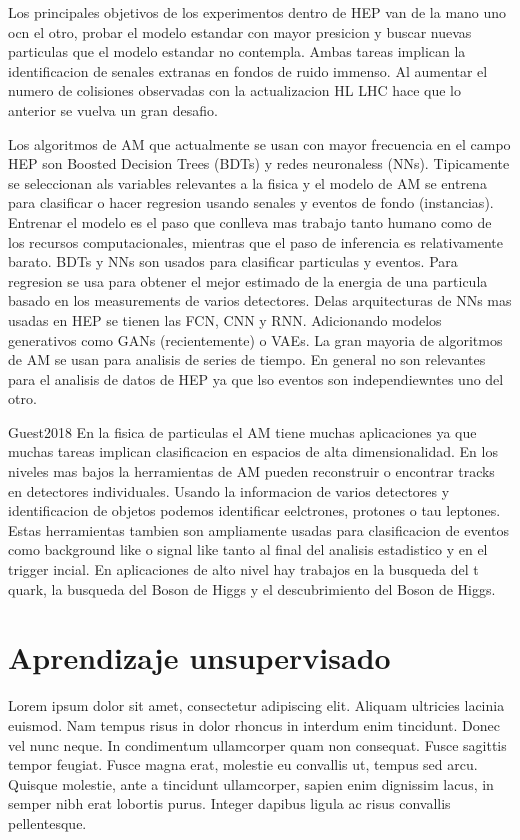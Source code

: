 Los principales objetivos de los experimentos dentro de HEP van de la mano uno ocn el otro, probar el modelo estandar con mayor presicion y buscar nuevas particulas que el modelo estandar no contempla.
Ambas tareas implican la identificacion de senales extranas en fondos de ruido immenso.
Al aumentar el numero de colisiones observadas con la actualizacion HL LHC hace que lo anterior se vuelva un gran desafio.

Los algoritmos de AM que actualmente se usan con mayor frecuencia en el campo HEP son Boosted Decision Trees (BDTs) y redes neuronaless (NNs).
Tipicamente se seleccionan als variables relevantes a la fisica y el modelo de AM se entrena para clasificar o hacer regresion usando senales y eventos de fondo (instancias). 
Entrenar el modelo es el paso que conlleva mas trabajo tanto humano como de los recursos computacionales, mientras que el paso de inferencia es relativamente barato. 
BDTs y NNs son usados para clasificar particulas y eventos.
Para regresion se usa para obtener el mejor estimado de la energia de una particula basado en los measurements de varios detectores.
Delas arquitecturas de NNs mas usadas en HEP se tienen las FCN, CNN y RNN. Adicionando modelos generativos como GANs (recientemente) o VAEs.
La gran mayoria de algoritmos de AM se usan para analisis de series de tiempo. En general no son relevantes para el analisis de datos de HEP ya que lso eventos son independiewntes uno del otro. 


Guest2018
En la fisica de particulas el AM tiene muchas aplicaciones ya que muchas tareas implican clasificacion en espacios de alta dimensionalidad. 
En los niveles mas bajos la herramientas de AM pueden reconstruir o encontrar tracks en detectores individuales. 
Usando la informacion de varios detectores y identificacion de objetos podemos identificar eelctrones, protones o tau leptones.
Estas herramientas tambien son ampliamente usadas para clasificacion de eventos como background like o signal like tanto al final del analisis estadistico y en el trigger incial.
En aplicaciones de alto nivel hay trabajos en la busqueda del t quark, la busqueda del Boson de Higgs y el descubrimiento del Boson de Higgs.


\section{Aprendizaje unsupervisado}

Lorem ipsum dolor sit amet, consectetur adipiscing elit. Aliquam ultricies lacinia euismod. Nam tempus risus in dolor rhoncus in interdum enim tincidunt. Donec vel nunc neque. In condimentum ullamcorper quam non consequat. Fusce sagittis tempor feugiat. Fusce magna erat, molestie eu convallis ut, tempus sed arcu. Quisque molestie, ante a tincidunt ullamcorper, sapien enim dignissim lacus, in semper nibh erat lobortis purus. Integer dapibus ligula ac risus convallis pellentesque.

